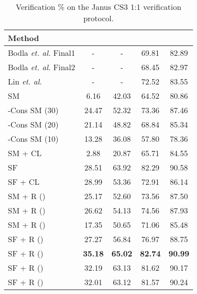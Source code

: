 \documentclass[10pt,twocolumn,letterpaper]{article}
\begin{document}
\begin{table}
\hfill
\centering
\begin{tabular}{l c c c c} 

\hline\hline 


Method  &   &      &     &      \\
\hline 

Bodla \emph{et. al.} Final1 \cite{bodla2017deep}   &  -  & -   &  69.81  & 82.89    \\
Bodla \emph{et. al.} Final2 \cite{bodla2017deep}   &  -   &  -   &  68.45  & 82.97   \\

Lin \emph{et. al.}  \cite{lin2017proximity}    &  -  &  -  & 72.52   &  83.55 \\

\hline
\hline
SM  &  6.16   & 42.03    & 64.52    &  80.86   \\ 
-Cons SM (30)  \cite{ranjan2017l2}&  24.47  & 52.32   & 73.36    &  87.46  \\ 
-Cons SM (20)  \cite{ranjan2017l2}&  21.14  & 48.82  &   68.84  &  85.34    \\ 
-Cons SM (10)  \cite{ranjan2017l2}& 13.28  & 36.08  & 57.80  & 78.36   \\ 
SM + CL \cite{wen2016discriminative} &  2.88  & 20.87   &  65.71    &  84.55   \\ 
SF  \cite{liu2017sphereface} &  28.51   &  63.92 &   82.29  &  90.58  \\
SF + CL \cite{wen2016discriminative, liu2017sphereface}  &  28.99  &    53.36    &  72.91  &    86.14 \\

\hline

SM + R ()   & 25.17  & 52.60  & 73.56  &  87.50  \\
SM + R  ()  &  26.62 &  54.13    & 74.56    &  87.93     \\ 
SM + R  ()  & 17.35 &  50.65   &  71.06  &  85.48   \\ 
\hline
SF + R  ()  &   27.27  &  56.84    &  76.97   &  88.75   \\ 
SF + R  ()  & \textbf{ 35.18 } &  \textbf{65.02}  &\textbf{ 82.74 } &   \textbf{90.99 }    \\ 
SF + R  ()  & 32.19    &  63.13     &    81.62   &  90.17   \\
SF + R  ()  &   32.01  & 63.12    & 81.57   &  90.24  \\ 








\hline
\end{tabular}
\caption{Verification \% on the Janus CS3 1:1 verification protocol. }
\label{tab_cs3}
\end{table}
\end{document}
